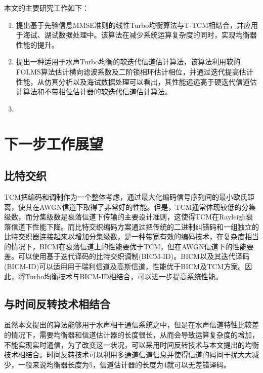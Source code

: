本文的主要研究工作如下：
\begin{enumerate}
  \item
      提出基于先验信息MMSE准则的线性Turbo均衡算法与T-TCM相结合，并应用于海试、湖试数据处理中。该算法在减少系统运算复杂度的同时，实现均衡器性能的提升。
  \item
      提出一种适用于水声Turbo均衡的软迭代信道估计算法，该算法利用软的FOLMS算法估计横向滤波系数及二阶锁相环估计相位，并通过迭代提高估计性能，从仿真分析以及海试数据处理可以看出，其性能远远高于硬迭代信道估计算法和不带相位估计器的软迭代信道估计算法。
  \item
\end{enumerate}
\section{下一步工作展望}
\subsection{比特交织}
TCM\citep{ungerboeck1982,Coded2004,Schlegel2004}把编码和调制作为一个整体考虑，通过最大化编码信号序列间的最小欧氏距离，使其在AWGN信道下取得了非常好的性能。但是，TCM通常体现较低的分集级数，而分集级数是衰落信道下传输的主要设计准则，这使得TCM在Rayleigh衰落信道下性能下降。而比特交织编码方案\citep{zehavi1992,Akay2004,Alvarado,Caire,Sethuraman}通过把传统的二进制纠错码和一组独立的比特交织器连接起来以增加分集级数，是一种带宽有效的编码技术，在复杂度相当的情况下，BICM在衰落信道上的性能要优于TCM，但在AWGN信道下的性能要差。可以使用基于迭代译码的比特交织调制(BICM-ID)。BICM以及其迭代译码(BICM-ID)\citep{LeGoff2006}可以适用用于瑞利信道及高斯信道，性能优于BICM及TCM方案。因此，将Turbo均衡技术与BICM-ID相结合，可以进一步提高系统性能\citep{Antoine2003}。
\subsection{与时间反转技术相结合}
虽然本文提出的算法能够用于水声相干通信系统之中，但是在水声信道特性比较差的情况下，需要均衡器和信道估计器的长度很长，从而会导致运算复杂度的增加，不能实现实时通信，为了改变这一状况，可以采用时间反转技术与本文提出的均衡技术相结合。时间反转技术可以利用多通道信道信息并使得信道的码间干扰大大减少，一般来说均衡器长度为5，信道估计器的长度为4就可以无差错译码。
%
\clearpage{\pagestyle{empty}\cleardoublepage}